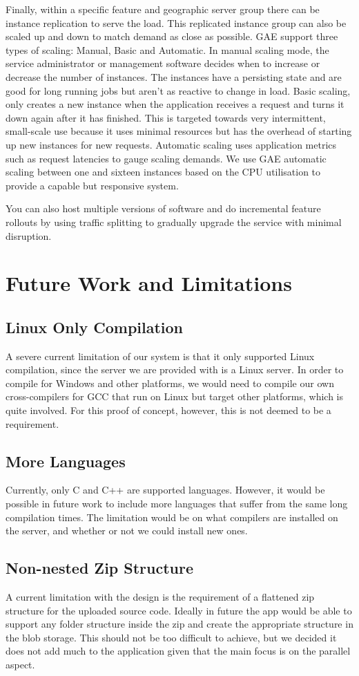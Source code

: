 \documentclass[conference]{IEEEtran}
\begin{document}
Finally, within a specific feature and geographic server group there can be
instance replication to serve the load. This replicated instance group can also
be scaled up and down to match demand as close as possible. GAE support three
types of scaling: Manual, Basic and Automatic. In manual scaling mode, the
service administrator or management software decides when to increase or
decrease the number of instances. The instances have a persisting state and are
good for long running jobs but aren't as reactive to change in load. Basic
scaling, only creates a new instance when the application receives a request and
turns it down again after it has finished. This is targeted towards very
intermittent, small-scale use because it uses minimal resources but has the
overhead of starting up new instances for new requests. Automatic scaling uses
application metrics such as request latencies to gauge scaling demands. We use
GAE automatic scaling between one and sixteen instances based on the CPU
utilisation to provide a capable but responsive system.

You can also host multiple versions of software and do incremental feature
rollouts by using traffic splitting to gradually upgrade the service with
minimal disruption.

\section{Future Work and Limitations}
\subsection{Linux Only Compilation}
A severe current limitation of our system is that it only supported Linux
compilation, since the server we are provided with is a Linux server. In order
to compile for Windows and other platforms, we would need to compile our own
cross-compilers for GCC that run on Linux but target other platforms, which is
quite involved. For this proof of concept, however, this is not deemed to be a
requirement.
\subsection{More Languages}
Currently, only C and C++ are supported languages. However, it would be possible
in future work to include more languages that suffer from the same long
compilation times. The limitation would be on what compilers are installed on
the server, and whether or not we could install new ones.
\subsection{Non-nested Zip Structure}
A current limitation with the design is the requirement of a flattened zip
structure for the uploaded source code. Ideally in future the app would be able
to support any folder structure inside the zip and create the appropriate
structure in the blob storage. This should not be too difficult to achieve, but
we decided it does not add much to the application given that the main focus is
on the parallel aspect.
\end{document}

